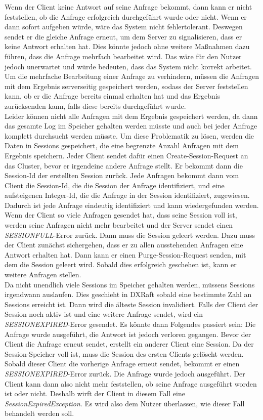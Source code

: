 Wenn der Client keine Antwort auf seine Anfrage bekommt, dann kann er nicht feststellen, ob die Anfrage erfolgreich durchgeführt wurde oder nicht. Wenn er dann sofort aufgeben würde, wäre das System nicht fehlertolerant. Deswegen sendet er die gleiche Anfrage erneut, um dem Server zu signalisieren, dass er keine Antwort erhalten hat. Dies könnte jedoch ohne weitere Maßnahmen dazu führen, dass die Anfrage mehrfach bearbeitet wird. Das wäre für den Nutzer jedoch unerwartet und würde bedeuten, dass das System nicht korrekt arbeitet. Um die mehrfache Bearbeitung einer Anfrage zu verhindern, müssen die Anfragen mit dem Ergebnis serverseitig gespeichert werden, sodass der Server feststellen kann, ob er die Anfrage bereits einmal erhalten hat und das Ergebnis zurücksenden kann, falls diese bereits durchgeführt wurde. \\
Leider können nicht alle Anfragen mit dem Ergebnis gespeichert werden, da dann das gesamte Log im Speicher gehalten werden müsste und auch bei jeder Anfrage komplett durchsucht werden müsste. Um diese Problematik zu lösen, werden die Daten in Sessions gespeichert, die eine begrenzte Anzahl Anfragen mit dem Ergebnis speichern. Jeder Client sendet dafür einen Create-Session-Request an das Cluster, bevor er irgendeine andere Anfrage stellt. Er bekommt dann die Session-Id der erstellten Session zurück. Jede Anfragen bekommt dann vom Client die Session-Id, die die Session der Anfrage identifiziert, und eine aufsteigenen Integer-Id, die die Anfrage in der Session identifiziert, zugewiesen. Dadurch ist jede Anfrage eindeutig identifiziert und kann wiedergefunden werden. \\
Wenn der Client so viele Anfragen gesendet hat, dass seine Session voll ist, werden seine Anfragen nicht mehr bearbeitet und der Server sendet einen \textit{SESSION\textunderscore FULL}-Error zurück. Dann muss die Session geleert werden. Dazu muss der Client zunächst sichergehen, dass er zu allen ausstehenden Anfragen eine Antwort erhalten hat. Dann kann er einen Purge-Session-Request senden, mit dem die Session geleert wird. Sobald dies erfolgreich geschehen ist, kann er weitere Anfragen stellen. \\
Da nicht unendlich viele Sessions im Speicher gehalten werden, müssens Sessions irgendwann auslaufen. Dies geschieht in DXRaft sobald eine bestimmte Zahl an Sessions erreicht ist. Dann wird die älteste Session invalidiert. Falls der Client der Session noch aktiv ist und eine weitere Anfrage sendet, wird ein \textit{SESSION\textunderscore EXPIRED}-Error gesendet. Es könnte dann Folgendes passiert sein: Die Anfrage wurde ausgeführt, die Antwort ist jedoch verloren gegangen. Bevor der Client die Anfrage erneut sendet, erstellt ein anderer Client eine Session. Da der Session-Speicher voll ist, muss die Session des ersten Clients gelöscht werden. Sobald dieser Client die vorherige Anfrage erneut sendet, bekommt er einen \textit{SESSION\textunderscore EXPIRED}-Error zurück. Die Anfrage wurde jedoch ausgeführt. Der Client kann dann also nicht mehr feststellen, ob seine Anfrage ausgeführt worden ist oder nicht. Deshalb wirft der Client in diesem Fall eine \textit{SessionExpiredException}. Es wird also dem Nutzer überlassen, wie dieser Fall behandelt werden soll. \\ 
